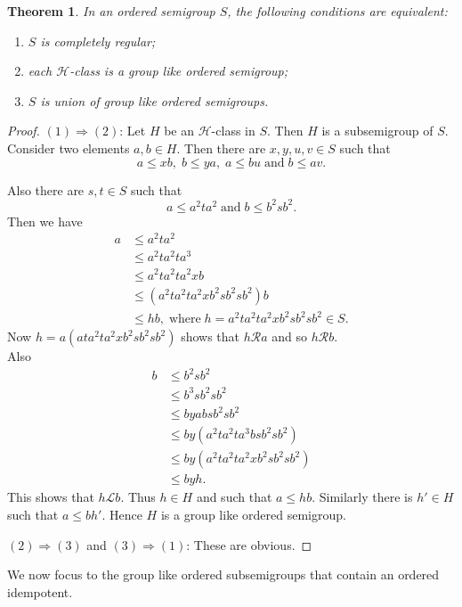 \documentclass[13pt]{article}
\newtheorem{Theorem}[theorem]{Theorem}
\theoremstyle{definition}
\theoremstyle{remark}
\numberwithin{equation}{section}
\newcommand{\lc}{\mathcal{L}}
\newcommand{\rc}{\mathcal{R}}
\newcommand{\hc}{\mathcal{H}}
\begin{document}
\begin{Theorem}\label{cr13}
In an ordered semigroup $S$,  the following conditions are
equivalent:
\begin{enumerate}
 \item \vspace{-.4cm}
$S$ is completely regular;
  \item \vspace{-.4cm}
each $\hc$-class is a group like ordered semigroup;
  \item \vspace{-.4cm}
$S$ is union of group like ordered semigroups.
\end{enumerate}
\end{Theorem}
\begin{proof}
$(1) \Rightarrow (2)$: Let $H$ be an $\hc$-class in $S$. Then $H$ is
a subsemigroup of $S$. Consider two elements $a, b \in H$. Then
there are $x, y, u, v \in S$ such that $$a \leq xb, \;b \leq ya, \;a
\leq bu \;\textrm{and} \;b \leq av.$$

Also there are $s, t \in S$ such that $$a \leq a^2 t a^2
\;\textrm{and} \;b \leq b^2 s b^2.$$ Then we have
\begin{align*}
  a &\leq a^2 t a^2\\
&\leq a^2 ta^2 ta^3\\
&\leq a^2 ta^2 ta^2 xb\\
&\leq (a^2 ta^2 ta^2x b^2 sb^2 sb^2 )b\\
&\leq hb,
  \;\textrm{where} \;h = a^2 ta^2 ta^2x b^2 sb^2 sb^2  \in S.
\end{align*}
Now $h = a(a ta^2 ta^2x b^2 sb^2 sb^2 )$ shows that $h \rc a$ and so
$h \rc b$.\\
Also
\begin{align*}
 b &\leq b^2 s b^2\\
&\leq b^3 sb^2 sb^2\\
&\leq by ab sb^2 sb^2\\
&\leq by(a^2 ta^2 ta^3 bs b^2 sb^2 )\\
&\leq by(a^2 ta^2 ta^2 xb^2 sb^2
sb^2)\\
&\leq byh.
\end{align*}
This  shows that $h \lc b$. Thus $h \in H$ and such that $a \leq
hb$. Similarly there is $h' \in H$ such that $a \leq bh'$. Hence $H$
is a group like ordered semigroup.

$(2)\Rightarrow (3)$ and $(3)\Rightarrow (1)$: These  are obvious.
\end{proof}

We now focus to  the  group like ordered subsemigroups  that contain
an ordered idempotent.
\end{document}
